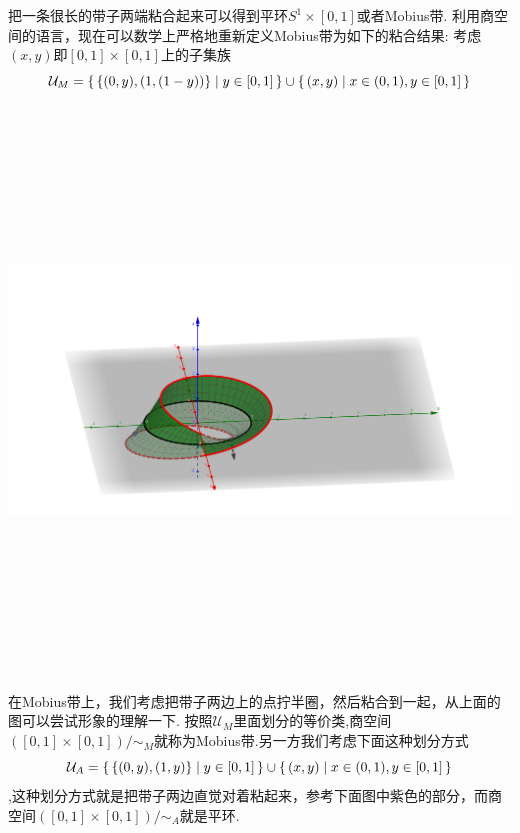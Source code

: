 \begin{example}
把一条很长的带子两端粘合起来可以得到平环$S^1 \times [0,1]$或者Mobius带. 利用商空间的语言，现在可以数学上严格地重新定义Mobius带为如下的粘合结果: 考虑$(x,y)$即$[0,1] \times [0,1]$上的子集族\[\mathcal{U}_M = \{\,\{(0,y),(1,(1-y))\}\mid y \in [0,1]\,\} \cup \{\,{(x,y)}\mid x \in (0,1), y \in [0,1]\,\} \]
\begin{center}
\includegraphics[width=20cm, height=15cm]{images/Mobius.png}
\end{center}
在Mobius带上，我们考虑把带子两边上的点拧半圈，然后粘合到一起，从上面的图可以尝试形象的理解一下. 按照$\mathcal{U}_M$里面划分的等价类,商空间$([0,1] \times [0,1]) / \sim_M$就称为Mobius带.另一方我们考虑下面这种划分方式\[\mathcal{U}_A = \{\,\{(0,y),(1,y)\}\mid y \in [0,1]\,\} \cup \{\,{(x,y)}\mid x \in (0,1), y \in [0,1]\,\}\],这种划分方式就是把带子两边直觉对着粘起来，参考下面图中紫色的部分，而商空间$([0,1] \times [0,1]) / \sim_A$就是平环.


\end{example}

